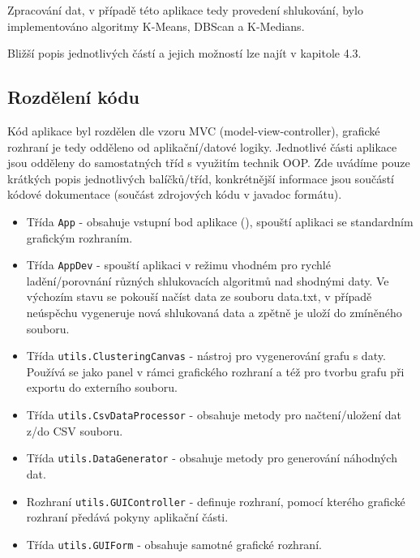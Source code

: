 \documentclass[pdftex,a4paper]{article}
\begin{document}
\noindent
Zpracování dat, v případě této aplikace tedy provedení shlukování, bylo implementováno algoritmy K-Means, DBScan a K-Medians.

Bližší popis jednotlivých částí a jejich možností lze najít v kapitole 4.3.



\subsection{Rozdělení kódu}
Kód aplikace byl rozdělen dle vzoru MVC (model-view-controller), grafické rozhraní je tedy odděleno od aplikační/datové logiky. Jednotlivé části aplikace jsou odděleny do samostatných tříd s využitím technik OOP. Zde uvádíme pouze krátkých popis jednotlivých balíčků/tříd, konkrétnější informace jsou součástí kódové dokumentace (součást zdrojových kódu v javadoc formátu).

\begin{itemize}
	\item Třída \texttt{App} - obsahuje vstupní bod aplikace (), spouští aplikaci se standardním grafickým rozhraním.
	
	\item Třída \texttt{AppDev} - spouští aplikaci v režimu vhodném pro rychlé ladění/porovnání různých shlukovacích algoritmů nad shodnými daty. Ve výchozím stavu se pokouší načíst data ze souboru data.txt, v případě neúspěchu vygeneruje nová shlukovaná data a zpětně je uloží do zmíněného souboru.
\end{itemize}

\medskip

\begin{itemize}
	\item Třída \texttt{utils.ClusteringCanvas} - nástroj pro vygenerování grafu s daty. Používá se jako panel v rámci grafického rozhraní a též pro tvorbu grafu při exportu do externího souboru.
	
	\item Třída \texttt{utils.CsvDataProcessor} - obsahuje metody pro načtení/uložení dat z/do CSV souboru.
	
	\item Třída \texttt{utils.DataGenerator} - obsahuje metody pro generování náhodných dat.
	
	\item Rozhraní \texttt{utils.GUIController} - definuje rozhraní, pomocí kterého grafické rozhraní předává pokyny aplikační části.
	
	\item Třída \texttt{utils.GUIForm} - obsahuje samotné grafické rozhraní.
\end{itemize}
\end{document}
